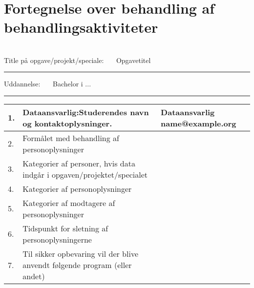 \documentclass[11pt, a4paper]{article}
\makeatletter
\newcommand{\opgavetitel}{ Opgavetitel }	 		%
\newcommand{\uddannelse}{ Bachelor i ... }	 		%
\newcommand{\dataansvarligNavn}{ Dataansvarlig }	%
\newcommand{\dataansvarligMail}{ name@example.org }	 				%
\newcommand{\dataansvarligTelefon}{ 12345678 }	 			%
\newcommand{\vejleder}{ }							%
\makeatother
\begin{document}
\pagestyle{fancy}
~
\vspace{1cm}

\section*{Fortegnelse over behandling af behandlingsaktiviteter}~\\



Title på opgave/projekt/speciale:~~~\opgavetitel
\hrule


\vspace{5mm}

Uddannelse:~~~\uddannelse
\vspace{1mm}
\hrule

\vspace{5mm}


\begin{table}[h]

\begin{tabular}{ | l p{} | p{} | }
\hline
1. & Dataansvarlig:\newline Studerendes navn og kontaktoplysninger.  					& \dataansvarligNavn \newline \dataansvarligMail \newline \dataansvarligTelefon \\ \hline  %
2. & Formålet med behandling af personoplysninger 								&              \\ \hline
3. & Kategorier af personer, hvis data indgår i opgaven/projektet/specialet 		&              \\ \hline  %
4. & Kategorier af personoplysninger 											&              \\ \hline  %
5. & Kategorier af modtagere af personoplysninger 								& \vejleder    \\ \hline  %
6. & Tidspunkt for sletning af personoplysningerne 								&              \\ \hline %
7. & Til sikker opbevaring vil der blive anvendt følgende program (eller andet) 	&              \\ \hline  %
\end{tabular}%

\end{table}
\end{document}
